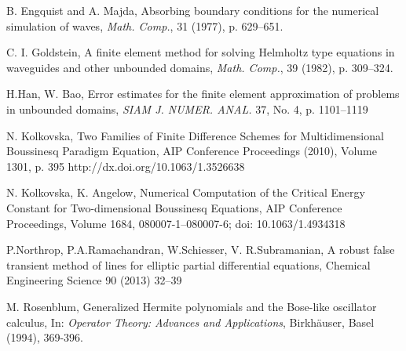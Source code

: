 \documentclass[12pt]{article}
\theoremstyle{theorem}
\theoremstyle{defi}
\begin{document}
\begin{thebibliography}{99}
 B. Engquist and A. Majda, Absorbing boundary conditions for the numerical simulation of waves, {\it Math. Comp.}, 31 (1977), p. 629–651.

  C. I. Goldstein, A finite element method for solving Helmholtz type equations in waveguides and other unbounded domains, {\it Math. Comp.}, 39 (1982), p. 309–324.

  H.Han, W. Bao, Error estimates for the finite element approximation of problems in unbounded domains,  {\it SIAM J. NUMER. ANAL.} 37, No. 4, p. 1101–1119

 N. Kolkovska, Two Families of Finite Difference Schemes for Multidimensional Boussinesq Paradigm Equation, AIP Conference Proceedings (2010), Volume 1301, p. 395 http://dx.doi.org/10.1063/1.3526638

 N. Kolkovska, K. Angelow, Numerical Computation of the Critical Energy Constant for Two-dimensional Boussinesq Equations,  AIP Conference Proceedings, Volume 1684, 080007-1–080007-6; doi: 10.1063/1.4934318

 P.Northrop, P.A.Ramachandran, W.Schiesser, V. R.Subramanian, A robust false transient method of lines for elliptic partial differential equations, Chemical Engineering Science 90 (2013) 32–39


 M. Rosenblum,
Generalized Hermite polynomials and the Bose-like oscillator
calculus, In: {\it Operator Theory: Advances and Applications},
Birkh\"auser, Basel (1994), 369-396.

\end{thebibliography}
\end{document}

